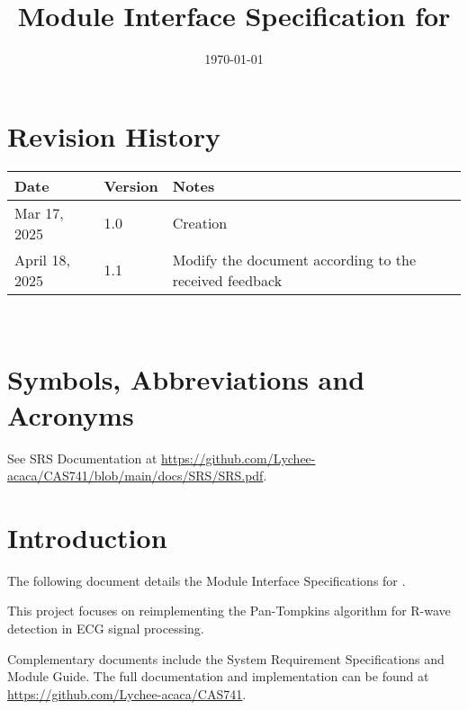\documentclass[12pt, titlepage]{article}
\begin{document}
\title{Module Interface Specification for \progname{}}

\author{\authname}

\date{\today}

\maketitle


\section{Revision History}

\begin{tabularx}{\textwidth}{p{3cm}p{2cm}X} \toprule {\bf Date} & {\bf Version}
& {\bf Notes}\\
\midrule
Mar 17, 2025 & 1.0 & Creation\\
April 18, 2025 & 1.1 & Modify the document according to the received feedback\\
\bottomrule
\end{tabularx}

~\newpage

\section{Symbols, Abbreviations and Acronyms}

See SRS Documentation at
\url{https://github.com/Lychee-acaca/CAS741/blob/main/docs/SRS/SRS.pdf}.


\newpage

\tableofcontents

\newpage


\section{Introduction}

The following document details the Module Interface Specifications for
\progname.

This project focuses on reimplementing the Pan-Tompkins algorithm for R-wave
detection in ECG signal processing.

Complementary documents include the System Requirement Specifications and Module
Guide.  The full documentation and implementation can be found at
\url{https://github.com/Lychee-acaca/CAS741}.
\end{document}
